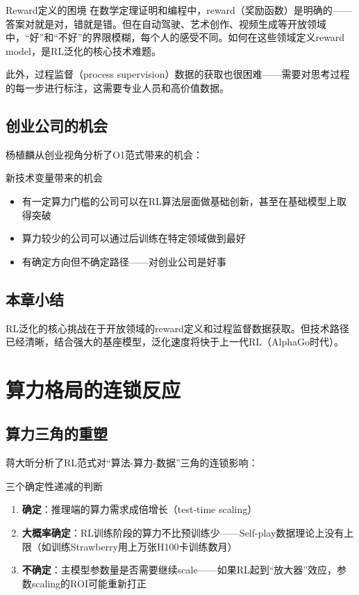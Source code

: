 \documentclass[a4paper]{article}
\begin{document}
\begin{warningbox}{Reward定义的困境}
在数学定理证明和编程中，reward（奖励函数）是明确的——答案对就是对，错就是错。但在自动驾驶、艺术创作、视频生成等开放领域中，``好''和``不好''的界限模糊，每个人的感受不同。如何在这些领域定义reward model，是RL泛化的核心技术难题。
\end{warningbox}

此外，过程监督（process supervision）数据的获取也很困难——需要对思考过程的每一步进行标注，这需要专业人员和高价值数据。

\subsection{创业公司的机会}

杨植麟从创业视角分析了O1范式带来的机会：

\begin{knowledgebox}{新技术变量带来的机会}
\begin{itemize}
\item 有一定算力门槛的公司可以在RL算法层面做基础创新，甚至在基础模型上取得突破
\item 算力较少的公司可以通过后训练在特定领域做到最好
\item 有确定方向但不确定路径——对创业公司是好事
\end{itemize}
\end{knowledgebox}

\subsection{本章小结}

RL泛化的核心挑战在于开放领域的reward定义和过程监督数据获取。但技术路径已经清晰，结合强大的基座模型，泛化速度将快于上一代RL（AlphaGo时代）。


\section{算力格局的连锁反应}

\subsection{算力三角的重塑}

蒋大昕分析了RL范式对``算法-算力-数据''三角的连锁影响：

\begin{importantbox}{三个确定性递减的判断}
\begin{enumerate}
\item \textbf{确定}：推理端的算力需求成倍增长（test-time scaling）
\item \textbf{大概率确定}：RL训练阶段的算力不比预训练少——Self-play数据理论上没有上限（如训练Strawberry用上万张H100卡训练数月）
\item \textbf{不确定}：主模型参数量是否需要继续scale——如果RL起到``放大器''效应，参数scaling的ROI可能重新打正
\end{enumerate}
\end{importantbox}
\end{document}
